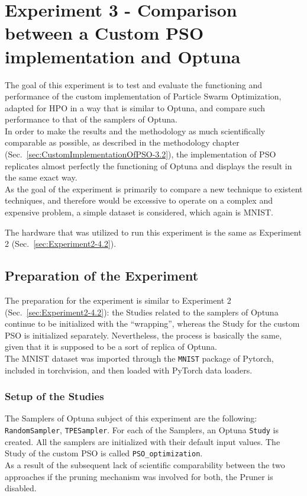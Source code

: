 \section{Experiment 3 - Comparison between a Custom PSO implementation and Optuna}

The goal of this experiment is to test and evaluate the functioning and performance of the custom implementation of Particle Swarm Optimization, adapted for HPO in a way that is similar to Optuna, and compare such performance to that of the samplers of Optuna.
\\[0.3cm]In order to make the results and the methodology as much scientifically comparable as possible, as described in the methodology chapter (Sec.~\ref{sec:CustomImplementationOfPSO-3.2}), the implementation of PSO replicates almost perfectly the functioning of Optuna and displays the result in the same exact way.
\\[0.3cm]As the goal of the experiment is primarily to compare a new technique to existent techniques, and therefore would be excessive to operate on a complex and expensive problem, a simple dataset is considered, which again is MNIST.

The hardware that was utilized to run this experiment is the same as Experiment 2 (Sec.~\ref{sec:Experiment2-4.2}).

\subsection{Preparation of the Experiment}

The preparation for the experiment is similar to Experiment 2 (Sec.~\ref{sec:Experiment2-4.2}): the Studies related to the samplers of Optuna continue to be initialized with the “wrapping”, whereas the Study for the custom PSO is initialized separately. Nevertheless, the process is basically the same, given that it is supposed to be a sort of replica of Optuna. 
\\[0.3cm]The MNIST dataset was imported through the \texttt{MNIST} package of Pytorch, included in torchvision, and then loaded with PyTorch data loaders.

\subsubsection{Setup of the Studies}

The Samplers of Optuna subject of this experiment are the following: \texttt{RandomSampler}, \texttt{TPESampler}.
For each of the Samplers, an Optuna \texttt{Study} is created. All the samplers are initialized with their default input values.
The Study of the custom PSO is called \texttt{PSO\_optimization}.
\\[0.3cm]As a result of the subsequent lack of scientific comparability between the two approaches if the pruning mechanism was involved for both, the Pruner is disabled.

